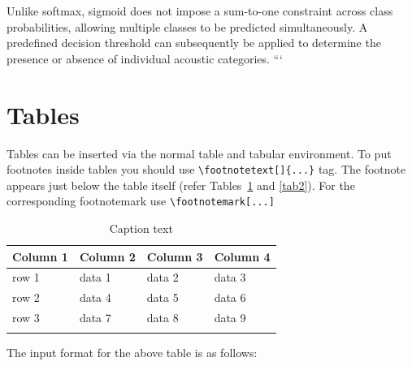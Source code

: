 \documentclass[pdflatex,sn-mathphys-num]{sn-jnl}%
\theoremstyle{thmstyleone}%
\theoremstyle{thmstyletwo}%
\theoremstyle{thmstylethree}%
\begin{document}
Unlike softmax, sigmoid does not impose a sum-to-one constraint across class probabilities, allowing multiple classes to be predicted simultaneously. A predefined decision threshold can subsequently be applied to determine the presence or absence of individual acoustic categories.
```

\section{Tables}\label{sec5}

Tables can be inserted via the normal table and tabular environment. To put
footnotes inside tables you should use \verb+\footnotetext[]{...}+ tag.
The footnote appears just below the table itself (refer Tables~\ref{tab1} and \ref{tab2}). 
For the corresponding footnotemark use \verb+\footnotemark[...]+

\begin{table}[h]
\caption{Caption text}\label{tab1}%
\begin{tabular}{@{}llll@{}}
\toprule
Column 1 & Column 2  & Column 3 & Column 4\\
\midrule
row 1    & data 1   & data 2  & data 3  \\
row 2    & data 4   & data 5\footnotemark[1]  & data 6  \\
row 3    & data 7   & data 8  & data 9\footnotemark[2]  \\
\botrule
\end{tabular}
\end{table}

\noindent
The input format for the above table is as follows:
\end{document}
